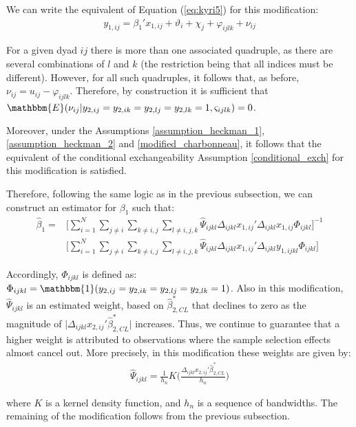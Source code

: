 We can write the equivalent of Equation (\ref{eq:kyri5}) for this modification:
\begin{align*}
    y_{1,ij} = \beta_1' x_{1,ij} + \vartheta_i + \chi_j + \varphi_{ijlk} + \nu_{ij}
\end{align*}

For a given dyad $ij$ there is more than one associated quadruple, as there are several combinations of $l$ and $k$ (the restriction being that all indices must be different). However, for all such quadruples, it follows that, as before, $\nu_{ij} = u_{ij} - \varphi_{ijlk}$. Therefore, by construction it is sufficient that $\mathbbm{E}(\nu_{ij} \rvert y_{2,ij} = y_{2,ik} = y_{2,lj} = y_{2,lk} =1, \varsigma_{ijlk}) = 0$.

Moreover, under the Assumptions \ref{assumption_heckman_1}, \ref{assumption_heckman_2} and \ref{modified_charbonneau}, it follows that the equivalent of the conditional exchangeability Assumption \ref{conditional_exch} for this modification is satisfied.

Therefore, following the same logic as in the previous subsection, we can construct an estimator for $\beta_1$ such that:
\begin{align}
    \hat{\beta}_1 = &\Big[ \sum_{i=1}^N \sum_{j \neq i} \sum_{k \neq i,j} \sum_{l \neq i,j,k} \hat{\Psi}_{ijkl} \Delta_{ijkl} x_{1,ij}' \Delta_{ijkl} x_{1,ij} \Phi_{ijkl}\Big]^{-1} \\
     &\Big[  \sum_{i=1}^N \sum_{j \neq i} \sum_{k \neq i,j} \sum_{l \neq i,j,k} \hat{\Psi}_{ijkl} \Delta_{ijkl} x_{1,ij}' \Delta_{ijkl} y_{1,ijkl} \Phi_{ijkl}\Big] \nonumber
\end{align}

Accordingly, $\Phi_{ijkl}$ is defined as: $\Phi_{ijkl} = \mathbbm{1}(y_{2,ij} = y_{2,ik} = y_{2,lj} = y_{2,lk} =1)$. Also in this modification, $\hat{\Psi}_{ijkl}$ is an estimated weight, based on $\hat{\beta}_{2,CL}^*$ that declines to zero as the magnitude of $\rvert \Delta_{ijkl}x_{2,ij}'{\hat{\beta}_{2,CL}^*} \rvert$ increases. Thus, we continue to guarantee that a higher weight is attributed to observations where the sample selection effects almost cancel out. More precisely, in this modification these weights are given by:
\begin{align} \label{kyri_weights}
    \hat{\Psi}_{ijkl} = \frac{1}{h_n} K \Big( \frac{\Delta_{ijkl} x_{2,ij}' \hat{\beta}_{2,CL}^*}{h_n} \Big)
\end{align}

\noindent where $K$ is a kernel density function, and $h_n$ is a sequence of bandwidths. The remaining of the modification follows from the previous subsection. 

